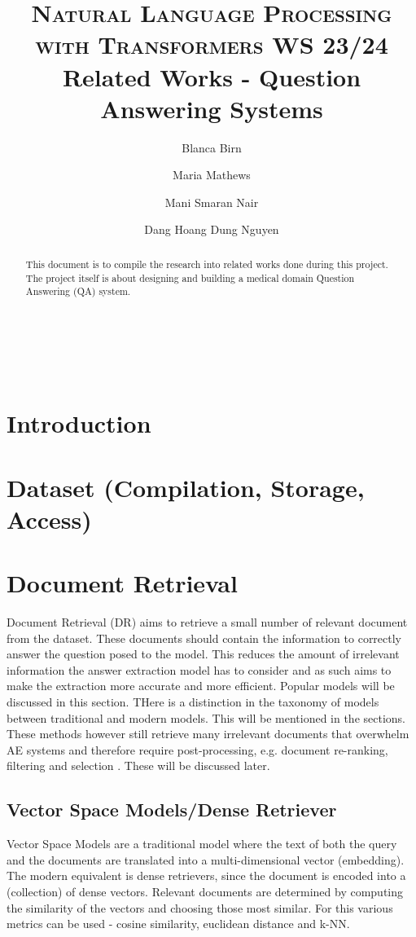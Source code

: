 \documentclass[10pt,twocolumn,letterpaper]{article}
\title{
	\usefont{OT1}{bch}{b}{n}
	\normalfont \normalsize \textsc{Natural Language Processing with Transformers WS 23/24} \\ [10pt]
	\huge Related Works - Question Answering Systems \\
}
\author[2]{Blanca Birn}
\author[1]{Maria Mathews}
\author[1]{Mani Smaran Nair}
\author[2]{Dang Hoang Dung Nguyen}
\affil[1]{\small{Institute for Data and Computer Science, University of Heidelberg}}
\affil[2]{Institute for Computational Linguistics, University of Heidelberg}
\begin{document}
	\maketitle
	
	\begin{abstract}
		This document is to compile the research into related works done during this project. The project itself is about designing and building a medical domain Question Answering (QA) system.
	\end{abstract} \\ 
	\\ 
	
	\section{Introduction}
		
	
	\section{Dataset (Compilation, Storage, Access)}
	
	\section{Document Retrieval}
	
	Document Retrieval (DR) aims to retrieve a small number of relevant document from the dataset. These documents should contain the information to correctly answer the question posed to the model. This reduces the amount of irrelevant information the answer extraction model has to consider and as such aims to make the extraction more accurate and more efficient. Popular models will be discussed in this section. THere is a distinction in the taxonomy of models between traditional and modern models. This will be mentioned in the sections. These methods however still retrieve many irrelevant documents that overwhelm AE systems and therefore require post-processing, e.g. document re-ranking, filtering and selection \cite{zhu2021retrieving}. These will be discussed later.\\
		
	\subsection{Vector Space Models/Dense Retriever} 
	Vector Space Models are a traditional model where the text of both the query and the documents are translated into a multi-dimensional vector (embedding). The modern equivalent is dense retrievers, since the document is encoded into a (collection) of dense vectors. Relevant documents are determined by computing the similarity of the vectors and choosing those most similar. For this various metrics can be used - cosine similarity, euclidean  distance \citep{zhu2021retrieving} and k-NN. 
	
\end{document}
